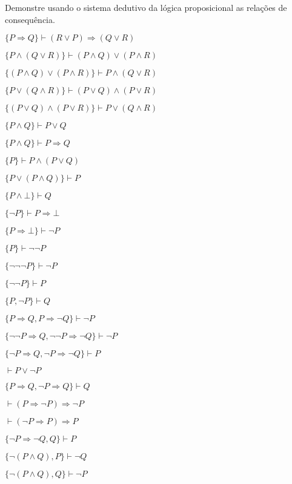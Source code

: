 \begin{questao}\label{test:LPro2}
  Demonstre usando o sistema dedutivo da lógica proposicional as relações de consequência.
\end{questao}

\begin{exerList}
  \item $\{P \Rightarrow Q\} \vdash (R \lor P) \Rightarrow (Q \lor R)$
  \item $\{P \land (Q \lor R)\} \vdash (P \land Q) \lor (P \land R)$
  \item $\{(P \land Q) \lor (P \land R)\} \vdash P \land (Q \lor R)$
  \item $\{P \lor (Q \land R)\} \vdash (P \lor Q) \land (P \lor R)$
  \item $\{(P \lor Q) \land (P \lor R)\} \vdash P \lor (Q \land R)$
  \item $\{P \land Q\} \vdash P \lor Q$
  \item $\{P \land Q\} \vdash P \Rightarrow Q$
  \item $\{P\} \vdash P \land (P \lor Q)$
  \item $\{P \lor (P \land Q)\} \vdash P$
  \item $\{P \land\bot \} \vdash Q$
  \item $\{\neg P\} \vdash P \Rightarrow  \bot$
  \item $\{P \Rightarrow  \bot\} \vdash \neg P$
  \item $\{P\} \vdash \neg \neg P$
  \item $\{\neg \neg \neg P\} \vdash \neg P$
  \item $\{\neg \neg P\} \vdash P$
  \item $\{P, \neg P\} \vdash Q$
  \item $\{P \Rightarrow Q, P \Rightarrow \neg Q\} \vdash \neg P$
  \item $\{\neg \neg P \Rightarrow Q, \neg \neg P \Rightarrow \neg Q\} \vdash \neg P$
  \item $\{\neg P \Rightarrow Q, \neg P \Rightarrow \neg Q\} \vdash P$
  \item $\vdash P \lor \neg P$
  \item $\{P \Rightarrow Q, \neg P \Rightarrow Q\} \vdash Q$
  \item $\vdash (P \Rightarrow \neg P) \Rightarrow \neg P$
  \item $\vdash (\neg P \Rightarrow P) \Rightarrow P$
  \item $\{\neg P \Rightarrow \neg Q, Q\} \vdash P$
  \item $\{\neg (P \land Q), P\} \vdash \neg Q$
  \item $\{\neg (P \land Q), Q\} \vdash \neg P$
\end{exerList}

